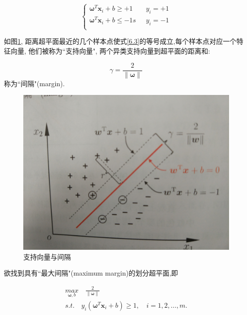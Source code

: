 \documentclass[12pt]{article}
\numberwithin{equation}{section}%
\begin{document}
\begin{equation}
\label{6.3}
 \left\{ \begin{array}{ll}
 \boldsymbol{\omega}^{T}\boldsymbol{x}_{i}+b \geqslant +1 & \textrm{ $y_{i}=+1$}\\
\boldsymbol{\omega}^{T}\boldsymbol{x}_{i}+b \leqslant -1 s &  \textrm{ $y_{i}=-1$}\\
\end{array} \right.
\end{equation}

如图\ref{6-2}, 距离超平面最近的几个样本点使式\ref{6.3}的等号成立,每个样本点对应一个特征向量, 他们被称为``支持向量", 两个异类支持向量到超平面的距离和:

\begin{equation}
\gamma=\frac{2}{\parallel \boldsymbol{\omega} \parallel}
\end{equation}
称为``间隔"(margin).
\begin{figure}
\centering\includegraphics[width=5in]{6-2.jpg}
\caption{支持向量与间隔}
\label{6-2}
\end{figure}

欲找到具有``最大间隔"(maximum margin)的划分超平面,即



\begin{equation}
\begin{split}        %
 {\underset{\boldsymbol{\omega},b}{max}} \quad \frac{2}{\parallel \boldsymbol{\omega} \parallel}  \\
 s.t. \quad y_{i}(\boldsymbol{\omega}^{T}\boldsymbol{x}_{i}+b) \geqslant 1, \quad i= 1,2, \ldots ,m.
\end{split}
\label{6-5}
\end{equation}
\end{document}
